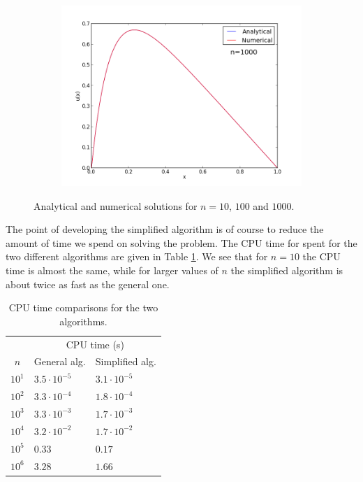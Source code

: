 \documentclass[12pt, a4paper]{article}
\begin{document}
\begin{figure}[ht!]
\begin{subfigure}[b]{0.495\textwidth}
        \caption{}
  \end{subfigure}
  \begin{subfigure}[b]{0.495\textwidth}
        \includegraphics[width=\textwidth]{../plot_n_1000.png}
        \caption{}
  \end{subfigure}
  \caption{Analytical and numerical solutions for $n=10$, $100$ and $1000$.} 
  \label{plots}
\end{figure}

The point of developing the simplified algorithm is of course to reduce the amount of time we spend on 
solving the problem. The CPU time for spent for the two different algorithms are given in Table  
\ref{CPU}. We see that for $n=10$ the CPU time is almost the same, while for larger values of $n$ the 
simplified algorithm is about twice as fast as the general one. 

\begin{table}[ht!]
\begin{center}
\begin{tabular}{c|l|l}
 & \multicolumn{2}{c}{CPU time (s)}  \\
$n$ & General alg. & Simplified alg. \\ \hline 
$10^1$ & $3.5\cdot10^{-5}$ & $3.1\cdot10^{-5}$  \\
$10^2$ & $3.3\cdot10^{-4}$ & $1.8\cdot10^{-4}$\\
$10^3$ & $3.3\cdot10^{-3}$ & $1.7\cdot10^{-3}$ \\
$10^4$ & $3.2\cdot10^{-2}$ & $1.7\cdot10^{-2}$\\
$10^5$ & $0.33$ & $0.17$ \\
$10^6$ & $3.28$ & $1.66$ \\ 
\end{tabular}
\caption{CPU time comparisons for the two algorithms.}
\label{CPU}
\end{center}
\end{table}
\end{document}
